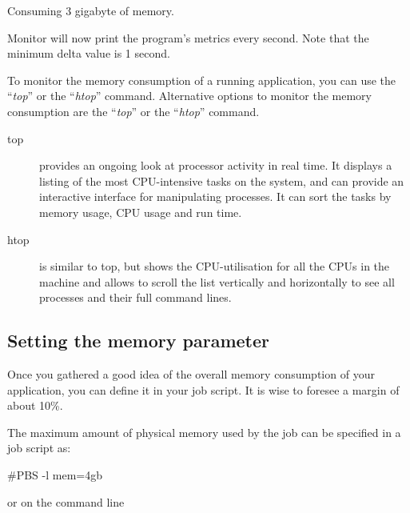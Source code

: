 \begin{prompt}
Consuming 3 gigabyte of memory.
\end{prompt}

Monitor will now print the program's metrics every second. Note that the
minimum delta value is 1 second.
\fi

\ifgent
To monitor the memory consumption of a running application, you can use the ``\emph{top}''
or the ``\emph{htop}'' command.
\else
  Alternative options to monitor the memory consumption are the ``\emph{top}''
  or the ``\emph{htop}'' command.
\fi

\begin{description}
  \item[top] provides an ongoing look at processor activity in real time. It displays a listing of the most CPU-intensive tasks on the system, and can provide an interactive interface for manipulating processes. It can sort the tasks by memory usage, CPU usage and run time.
  \item[htop] is similar to top, but shows the CPU-utilisation for all the CPUs in the machine and allows to scroll the list vertically and horizontally to see all processes and their full command lines.
\end{description}

\begin{prompt}
\end{prompt}

\subsection{Setting the memory parameter}

Once you gathered a good idea of the overall memory consumption of your
application, you can define it in your job script.  It is wise to foresee a
margin of about 10\%.


The maximum amount of physical memory used by the job can be specified in a job
script as:

\begin{prompt}
#PBS -l mem=4gb
\end{prompt}

or on the command line

\begin{prompt}
\end{prompt}

